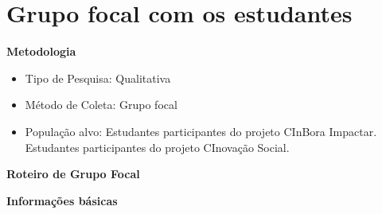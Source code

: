 \chapter{Grupo focal com os estudantes}
\par\vspace{1\baselineskip}
\textbf{Metodologia}
\begin{itemize}
    \item Tipo de Pesquisa: Qualitativa
    \item Método de Coleta: Grupo focal
    \item População alvo: Estudantes participantes do projeto CInBora Impactar. Estudantes participantes do projeto CInovação Social.
\end{itemize}
\par\vspace{1\baselineskip}
\textbf{Roteiro de Grupo Focal}
\par\vspace{1\baselineskip}
\textbf{Informações básicas}

